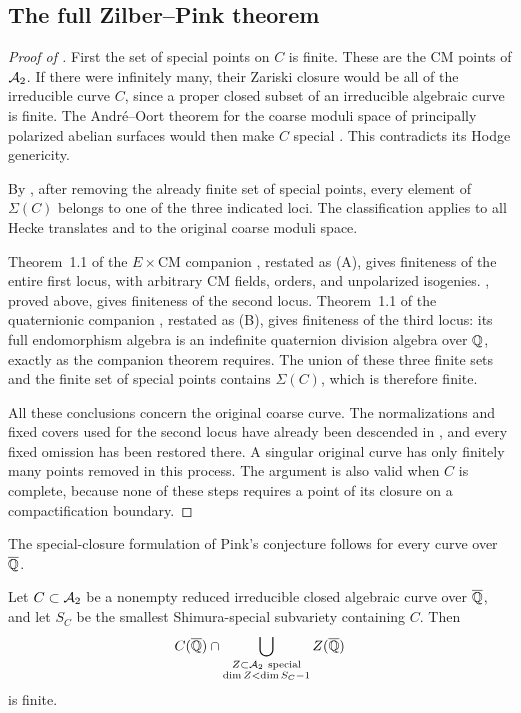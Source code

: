 \subsection{The full Zilber--Pink theorem}\label{fin:complete}

\begin{proof}[Proof of ]
First the set of special points on $C$ is finite.  These are the CM
points of $\mathcal A_2$.  If there were infinitely many, their Zariski
closure would be all of the irreducible curve $C$, since a proper
closed subset of an irreducible algebraic curve is finite.
The Andr\'e--Oort theorem for the coarse moduli space of principally
polarized abelian surfaces would then make $C$ special
\cite[Theorem~1.1]{PilaTsimerman2013}.  This contradicts its Hodge
genericity.

By , after removing the already finite set
of special points, every element of $\Sigma(C)$ belongs to one of
the three indicated loci. The classification applies to all Hecke
translates and to the original coarse moduli space.

Theorem~1.1 of the $E\times\mathrm{CM}$ companion
\cite{CompanionECM}, restated as (A), gives
finiteness of the entire first locus, with arbitrary CM fields,
orders, and unpolarized isogenies. , proved
above, gives finiteness of the second locus. Theorem~1.1 of the
quaternionic companion \cite{CompanionQuaternion}, restated as
(B), gives finiteness of the third locus:
its full endomorphism algebra is an indefinite quaternion division
algebra over $\mathbb Q$, exactly as the companion theorem requires.
The union of these three finite sets and the finite set of special
points contains $\Sigma(C)$, which is therefore finite.

All these conclusions concern the original coarse curve.  The
normalizations and fixed covers used for the second locus have
already been descended in , and every fixed omission
has been restored there.  A singular original curve has only
finitely many points removed in this process.  The argument is also
valid when $C$ is complete, because none of these steps requires
a point of its closure on a compactification boundary.
\end{proof}

The special-closure formulation of Pink's conjecture
\cite[Conjecture~1.2]{Pink2005} follows for every curve over $\overline{\mathbb Q}$.

\begin{corollary}
\label{fin:special-closure}
Let $C\subset\mathcal A_2$ be a nonempty reduced irreducible closed algebraic
curve over $\overline{\mathbb Q}$, and let $S_C$ be the smallest Shimura-special
subvariety containing $C$. Then
\[
 C(\overline{\mathbb Q})\cap
 \bigcup_{\substack{Z\subset\mathcal A_2\ \mathrm{special}\mathstrut\\
                     \dim Z<\dim S_C-1}} Z(\overline{\mathbb Q})
\]
is finite.
\end{corollary}


